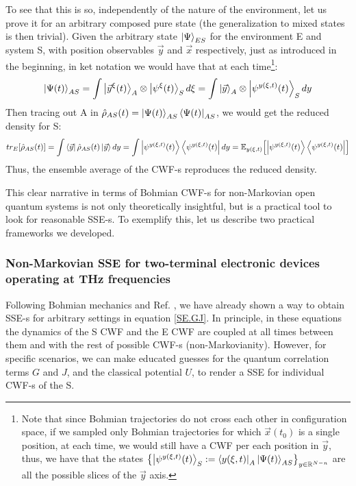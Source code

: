 \documentclass[11pt, a4paper]{article} %
\newcommand{\R}{\mathbb{R}} %
\begin{document}
To see that this is so, independently of the nature of the environment, let us prove it for an arbitrary composed pure state (the generalization to mixed states is then trivial). Given the arbitrary state $\ket{\Psi}_{ES}$ for the environment E and system S, with position observables $\vec{y}$ and $\vec{x}$ respectively, just as introduced in the beginning, in ket notation we would have that at each time\footnote{Note that since Bohmian trajectories do not cross each other in configuration space, if we sampled only Bohmian trajectories for which $\vec{x}(t_0)$ is a single position, at each time, we would still have a CWF per each position in $\vec{y}$, thus, we have that the states $\qty{\ket{\psi^{y(\xi,t)}(t)}_S:=\bra{y(\xi,t)}_A\ket{\Psi(t)}_{AS}}_{y\in\R^{N-n}}$ are all the possible slices of the $\vec{y}$ axis.}:
\begin{equation}
\ket{\Psi(t)}_{AS}=\int\ket{\vec{y}^\xi(t)}_A\otimes \ket{\psi^\xi(t)}_S d\xi = \int\ket{\vec{y}}_A\otimes \ket{\psi^{y(\xi,t)}(t)}_S dy
\end{equation}
Then tracing out A in $\hat{\rho}_{AS}(t)=\ket{\Psi(t)}_{AS}\bra{\Psi(t)}_{AS}$, we would get the reduced density for S:
\begin{equation}
tr_E\qty[\hat{\rho}_{AS}(t)] = \int\bra{\vec{y}}\hat{\rho}_{AS}(t)\ket{\vec{y}}dy = \int \ket{\psi^{y(\xi,t)}(t)}\bra{\psi^{y(\xi,t)}(t)} dy = \mathbb{E}_{y(\xi,t)}\qty[\ket{\psi^{y(\xi,t)}(t)}\bra{\psi^{y(\xi,t)}(t)}]
\end{equation}
Thus, the ensemble average of the CWF-s reproduces the reduced density.

This clear narrative in terms of Bohmian CWF-s for non-Markovian open quantum systems is not only theoretically insightful, but is a practical tool to look for reasonable SSE-s. To exemplify this, let us describe two practical frameworks we developed.

\subsubsection*{Non-Markovian SSE for two-terminal electronic devices operating at THz frequencies}
Following Bohmian mechanics and Ref. \cite{GJ}, we have already shown a way to obtain SSE-s for arbitrary settings in equation \eqref{SE.GJ}. In principle, in these equations the dynamics of the S CWF and the E CWF are coupled at all times between them and with the rest of possible CWF-s (non-Markovianity). However, for specific scenarios, we can make educated guesses for the quantum correlation terms $G$ and $J$, and the classical potential $U$, to render a SSE for individual CWF-s of the S.
\end{document}
